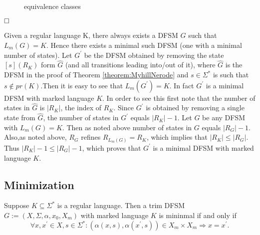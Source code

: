 \begin{example}
	\begin{figure}[htbp]
      \centering
      \hspace{2cm} %
	  \caption{equivalence classes}
	  \label{fig:equiv}
	\end{figure}
	$\hfill\square$
\end{example}

\begin{remark}
	Given a regular language K, there always exists a DFSM $G$ such
	that $L_m(G) = K$. Hence there exists a minimal such DFSM (one with a minimal number of states). Let $G^\prime$ be the DFSM obtained by removing the state $[s](R_K)$ form $\hat{G}$ (and all transitions leading into/out of it), where $\hat{G}$ is the DFSM in the proof of Theorem \ref{theorem:MyhillNerode} and $s\in \Sigma^\ast$ is such that $s\notin pr(K)$.Then it is easy to see that $L_m(G^\prime) = K$. In fact $G^\prime$ is a minimal DFSM with marked language $K$. In order to see this first note that the number of states in $\hat{G}$ is $|R_K|$, the index of $R_K$. Since $G^\prime$ is obtained by removing a single state from $\hat{G}$, the number of states in $G^\prime$ equals $|R_K|-1$. Let $G$ be any DFSM with $L_m(G) = K$. Then as noted above number of states in $G$ equals $|R_G|-1$. Also,as noted above, $R_G$ refines $R_{L_m(G)} = R_K$, which implies that $|R_K|\le |R_G|$. Thus $|R_K| - 1\le |R_G| - 1$, which proves that $G^\prime$ is a minimal DFSM with marked language $K$.
\end{remark}

\subsection{Minimization}

\begin{theorem}[Minimal $K$] \label{theorem:Minimal}
	Suppose $K\subseteq \Sigma^\ast$ is a regular language. Then a trim DFSM $G:=(X,\Sigma,\alpha,x_0,X_m)$ with marked language $K$ is mininmal if and only if
	$$\forall x,x^\prime\in X,s\in \Sigma^\ast :(\alpha(x,s),\alpha(x^\prime,s))\in X_m\times X_m\Rightarrow x=x^\prime .$$
\end{theorem}

